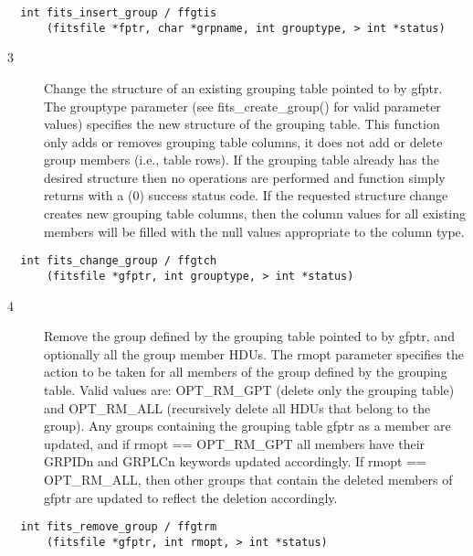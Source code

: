 \documentclass[11pt]{book}
\begin{document}
\begin{verbatim}
  int fits_insert_group / ffgtis
      (fitsfile *fptr, char *grpname, int grouptype, > int *status)
\end{verbatim}

\begin{description}
\item[3 ]Change the structure of an existing grouping table pointed to by
   gfptr. The grouptype parameter (see fits\_create\_group() for valid
   parameter values) specifies the new structure of the grouping table. This
   function only adds or removes grouping table columns, it does not add
   or delete group members (i.e., table rows). If the grouping table already
   has the desired structure then no operations are performed and function
   simply returns with a (0) success status code. If the requested structure
   change creates new grouping table columns, then the column values for all
   existing members will be filled with the null values appropriate to the
  column type. \label{ffgtch}
\end{description}

\begin{verbatim}
  int fits_change_group / ffgtch
      (fitsfile *gfptr, int grouptype, > int *status)
\end{verbatim}

\begin{description}
\item[4 ]Remove the group defined by the grouping table pointed to by gfptr, and
   optionally all the group member HDUs. The rmopt parameter specifies the
   action to be taken for
   all members of the group defined by the grouping table. Valid values are:
   OPT\_RM\_GPT (delete only the grouping table) and OPT\_RM\_ALL (recursively
   delete all HDUs that belong to the group). Any groups containing the
   grouping table gfptr as a member are updated, and if rmopt == OPT\_RM\_GPT
   all members have their GRPIDn and GRPLCn  keywords updated accordingly.
   If rmopt == OPT\_RM\_ALL, then other groups that contain the deleted members
  of gfptr are updated to reflect the deletion accordingly. \label{ffgtrm}
\end{description}

\begin{verbatim}
  int fits_remove_group / ffgtrm
      (fitsfile *gfptr, int rmopt, > int *status)
\end{verbatim}
\end{document}
